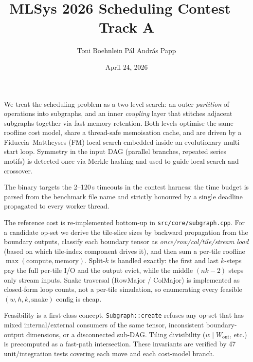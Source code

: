 \documentclass[10pt,a4paper]{article}
\title{MLSys 2026 Scheduling Contest -- Track A}
\author{Toni Boehnlein \quad P\'al Andr\'as Papp}
\date{April 24, 2026}
\makeatletter
\renewcommand\section{\@startsection{section}{1}{\z@}{6pt}{2pt}{\normalsize\bfseries}}
\renewcommand\maketitle{
  \begin{center}
    {\large\bfseries\@title}\par\vspace{2pt}
    {\small\@author}\par\vspace{1pt}
    {\small\@date}\par
  \end{center}
  \vspace{-0.3em}
}
\makeatother
\begin{document}
\maketitle

\section{Overview}

We treat the scheduling problem as a two-level search: an outer
\emph{partition} of operations into subgraphs, and an inner \emph{coupling}
layer that stitches adjacent subgraphs together via fast-memory retention.
Both levels optimise the same roofline cost model, share a thread-safe
memoisation cache, and are driven by a Fiduccia--Mattheyses (FM) local search
embedded inside an evolutionary multi-start loop. Symmetry in the input DAG
(parallel branches, repeated series motifs) is detected once via Merkle
hashing and used to guide local search and crossover.

The binary targets the 2--120\,s timeouts in the contest harness: the time
budget is parsed from the benchmark file name and strictly honoured by a
single deadline propagated to every worker thread.

\section{Cost model}

The reference cost is re-implemented bottom-up in
\texttt{src/core/subgraph.cpp}. For a candidate op-set we derive the
tile-slice sizes by backward propagation from the boundary outputs, classify
each boundary tensor as \emph{once/row/col/tile/stream load} (based on
which tile-index component drives it), and then sum a per-tile roofline
$\max(\text{compute},\text{memory})$. Split-$k$ is handled exactly: the
first and last $k$-steps pay the full per-tile I/O and the output evict,
while the middle $(nk{-}2)$ steps only stream inputs. Snake traversal
(RowMajor / ColMajor) is implemented as closed-form loop counts, not a
per-tile simulation, so enumerating every feasible $(w,h,k,\text{snake})$
config is cheap.

Feasibility is a first-class concept. \texttt{Subgraph::create} refuses any
op-set that has mixed internal/external consumers of the same tensor,
inconsistent boundary-output dimensions, or a disconnected sub-DAG.
Tiling divisibility ($w \mid W_{\text{out}}$, etc.) is precomputed as a
fast-path intersection. These invariants are verified by 47
unit/integration tests covering each move and each cost-model branch.
\end{document}
